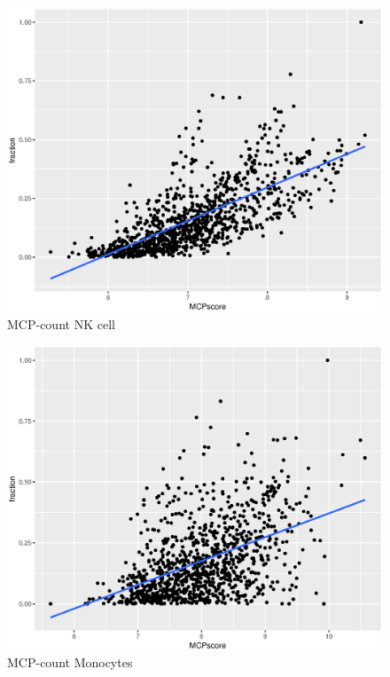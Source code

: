 \documentclass{article}
\begin{document}
 \begin{figure}[H]
     \centering
     \includegraphics[width=5in]{MCP-NK.eps}
     \caption{MCP-count NK cell}
     \label{fig:my_label}
 \end{figure}
 \begin{figure}[H]
     \centering
     \includegraphics[width=5in]{MCP-MONO.eps}
     \caption{MCP-count Monocytes}
     \label{fig:my_label}
 \end{figure}
\end{document}

